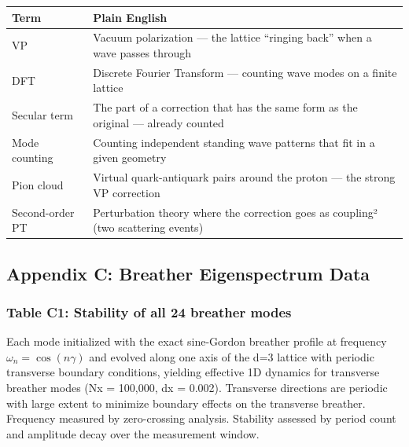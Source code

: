 \documentclass[
]{article}
\newcounter{none} %
\begin{document}
{\def\LTcaptype{none} %
\begin{longtable}[]{@{}
  >{\raggedright\arraybackslash}p{}
  >{\raggedright\arraybackslash}p{}@{}}
\toprule\noalign{}
\begin{minipage}[b]{\linewidth}\raggedright
Term
\end{minipage} & \begin{minipage}[b]{\linewidth}\raggedright
Plain English
\end{minipage} \\
\midrule\noalign{}
\endhead
\bottomrule\noalign{}
\endlastfoot
VP & Vacuum polarization --- the lattice ``ringing back'' when a wave
passes through \\
DFT & Discrete Fourier Transform --- counting wave modes on a finite
lattice \\
Secular term & The part of a correction that has the same form as the
original --- already counted \\
Mode counting & Counting independent standing wave patterns that fit in
a given geometry \\
Pion cloud & Virtual quark-antiquark pairs around the proton --- the
strong VP correction \\
Second-order PT & Perturbation theory where the correction goes as
coupling² (two scattering events) \\
\end{longtable}
}

\subsection{Appendix C: Breather Eigenspectrum
Data}\label{appendix-c-breather-eigenspectrum-data}

\subsubsection{Table C1: Stability of all 24 breather
modes}\label{table-c1-stability-of-all-24-breather-modes}

Each mode initialized with the exact sine-Gordon breather profile at
frequency \(\omega_n = \cos(n\gamma)\) and evolved along one axis of the
d=3 lattice with periodic transverse boundary conditions, yielding
effective 1D dynamics for transverse breather modes (Nx = 100,000, dx =
0.002). Transverse directions are periodic with large extent to minimize
boundary effects on the transverse breather. Frequency measured by
zero-crossing analysis. Stability assessed by period count and amplitude
decay over the measurement window.
\end{document}
